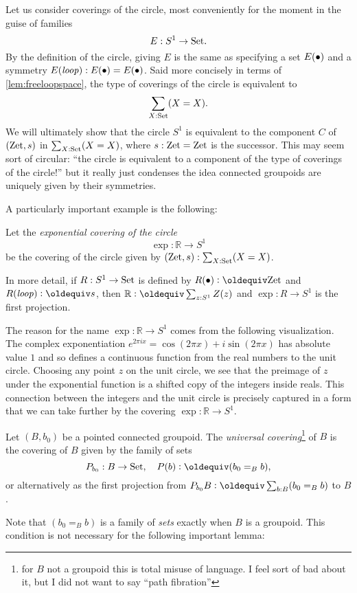 \begin{remark}
  \label{xca:coveringsofS1}
  Let us consider coverings of the circle, most conveniently for the moment in the guise of families 
$$E:S^1\to\mathord{\mathrm{Set}}.$$
By the definition of the circle, giving $E$ is the same as specifying a set $E(\bullet)$ and a symmetry $E(\mathit{loop}):E(\bullet)=E(\bullet)$.  Said more concisely in terms of \cref{lem:freeloopspace}, the type of coverings of the circle is equivalent to 
$$\sum_{X:\mathord{\mathrm{Set}}}(X=X).$$
We will ultimately show that the circle $S^1$ is equivalent to the component $C$ of $(\mathrm{Zet},s)$ in $\sum_{X:\mathord{\mathrm{Set}}}(X=X)$,  where $s:\mathrm{Zet}=\mathrm{Zet}$ is the successor.  This may seem sort of circular: ``the circle is equivalent to a component of the type of coverings of the circle!'' but it really just condenses the idea connected groupoids are uniquely given by their symmetries.
\end{remark}
A particularly important example is the following:
\begin{definition}
  \label{def:RtoS1}
  Let the \emph{exponential covering of the circle}
$$\exp:\mathbb R\to S^1$$ 
be the covering of the circle given by $(\mathrm{Zet},s):\sum_{X:\mathord{\mathrm{Set}}}(X=X)$.  
\end{definition}

In more detail, if $R:S^1\to\mathord{\mathrm{Set}}$ is defined by $R(\base)\defequi\zet$ and $R(\Sloop)\defequi s$, then $\mathbb R\defequi\sum_{z:S^1}Z(z)$ and $\exp:R\to S^1$ is the first projection.

\begin{remark}
  \label{rem:expforreal}
  The reason for the name $\exp:\mathbb R\to S^1$ comes from the following visualization.  
The complex exponentiation $e^{2\pi i x}=\cos(2\pi x)+i\sin(2\pi x)$ has absolute value $1$ and so defines a continuous function from the real numbers to the unit circle.  
Choosing any point $z$ on the unit circle, we see that the preimage of $z$ under the exponential function is a shifted copy of the integers inside reals.  
This connection between the integers and the unit circle is precisely captured in a form that we can take further by the covering $\exp:\mathbb R\to S^1$.
\end{remark}

\begin{definition}
  \label{def:universalcover}
  Let $(B,b_0)$ be a pointed connected groupoid.  
The \emph{universal covering}\footnote{for $B$ not a groupoid this is total misuse of language.  I feel sort of bad about it, but I did not want to say ``path fibration''} of $B$ is the covering of $B$ given by the family of sets 
  $$P_{b_0}:B\to\Set,\quad P(b)\defequi (b_0=_Bb),$$
or alternatively as the first projection from $P_{b_0}B\defequi\sum_{b:B}(b_0=_Bb)$ to $B$. 
\end{definition}
Note that $(b_0=_Bb)$ is a family of \emph{sets} exactly when $B$ is a groupoid.  
This condition is not necessary for the following important lemma:

